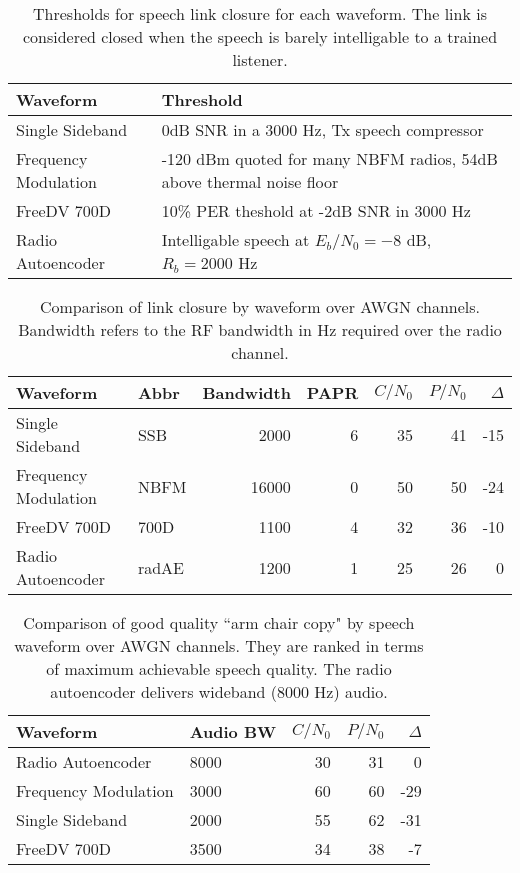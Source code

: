 \documentclass{article}
\begin{document}
\begin{table} [H]
\centering
\begin{tabular}{  m{3.5cm} | m{7cm}  }
 \hline
 Waveform             & Threshold \\
 \hline
 Single Sideband      & 0dB SNR in a 3000 Hz, Tx speech compressor \\
 Frequency Modulation & -120 dBm quoted for many NBFM radios, 54dB above thermal noise floor \\
 FreeDV 700D          & 10\% PER theshold at -2dB SNR in 3000 Hz \\
 Radio Autoencoder    & Intelligable speech at $E_b/N_0=-8$ dB, $R_b=2000$ Hz\\
 \hline
\end{tabular}
\caption{Thresholds for speech link closure for each waveform. The link is considered closed when the speech is barely intelligable to a trained listener.}
\label{tab:waveforms_thresh}
\end{table}

\begin{table} [H]
\centering
\begin{tabular}{l l r r r r r}
 \hline
 Waveform             & Abbr  & Bandwidth & PAPR & $C/N_0$ & $P/N_0$ & $\Delta$ \\
 \hline
 Single Sideband      & SSB   & 2000  &  6 & 35 & 41 & -15 \\
 Frequency Modulation & NBFM  & 16000 &  0 & 50 & 50 & -24 \\
 FreeDV 700D          & 700D  & 1100  &  4 & 32 & 36 & -10 \\
 Radio Autoencoder    & radAE & 1200  &  1 & 25 & 26 &  0 \\
 \hline
\end{tabular}
\caption{Comparison of link closure by waveform over AWGN channels. Bandwidth refers to the RF bandwidth in Hz required over the radio channel.}
\label{tab:waveforms_linkclosure}
\end{table}

\begin{table} [H]
\centering
\begin{tabular}{l l r r r}
 \hline
 Waveform             & Audio BW & $C/N_0$ & $P/N_0$ & $\Delta$ \\
 \hline
 Radio Autoencoder    & 8000 & 30 & 31 &  0  \\
 Frequency Modulation & 3000 & 60 & 60 & -29 \\
 Single Sideband      & 2000 & 55 & 62 & -31 \\
 FreeDV 700D          & 3500 & 34 & 38 & -7  \\
 \hline
\end{tabular}
\caption{Comparison of good quality ``arm chair copy" by speech waveform over AWGN channels. They are ranked in terms of maximum achievable speech quality. The radio autoencoder delivers wideband (8000 Hz) audio.}
\label{tab:waveforms_good}
\end{table}
\end{document}

